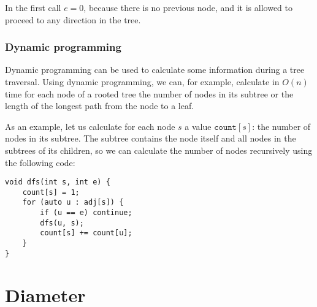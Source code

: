 In the first call $e=0$, because there is no
previous node, and it is allowed
to proceed to any direction in the tree.

\subsubsection{Dynamic programming}

Dynamic programming can be used to calculate
some information during a tree traversal.
Using dynamic programming, we can, for example,
calculate in $O(n)$ time for each node of a rooted tree the
number of nodes in its subtree
or the length of the longest path from the node
to a leaf.

As an example, let us calculate for each node $s$
a value $\texttt{count}[s]$: the number of nodes in its subtree.
The subtree contains the node itself and
all nodes in the subtrees of its children,
so we can calculate the number of nodes
recursively using the following code:

\begin{lstlisting}
void dfs(int s, int e) {
    count[s] = 1;
    for (auto u : adj[s]) {
        if (u == e) continue;
        dfs(u, s);
        count[s] += count[u];
    }
}
\end{lstlisting}

\section{Diameter}


